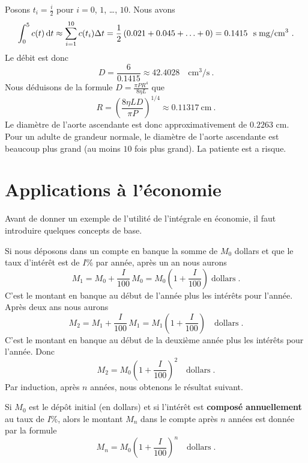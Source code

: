 {\begin{egg}
Posons $\displaystyle t_i = \frac{i}{2}$ pour $i=0$, $1$, \ldots,
$10$.  Nous avons
\[
\int_0^{5} c(t) \,\mathrm{d}t \approx \sum_{i=1}^{10} c(t_i) \Delta t
= \frac{1}{2} \left( 0.021 + 0.045 + \ldots + 0\right) = 0.1415
\ \text{ s\;mg/cm${^3}$} \ .
\]
Le débit est donc
\[
D = \frac{6}{0.1415} \approx 42.4028 \quad \text{cm$^3$/s} \ .
\]
Nous déduisons de la formule
$\displaystyle D = \frac{\pi P R^4}{8\eta L}$ que
\[
R = \left(\frac{8\eta L D}{\pi P}\right)^{1/4} \approx 0.11317 \
\text{cm} \ .
\]
Le diamètre de l'aorte ascendante est donc approximativement de $0.2263$ cm.
Pour un adulte de grandeur normale, le diamètre de l'aorte ascendante est
beaucoup plus grand (au moins $10$ fois plus grand).  La patiente est
a risque.
\end{egg}

\section{Applications à l'économie \eco}

Avant de donner un exemple de l'utilité de l'intégrale en économie, il faut
introduire quelques concepts de base.

Si nous déposons dans un compte en banque la somme de $M_0$ dollars et que le
taux d'intérêt est de $I$\% par année, après un an nous aurons
\[
M_1 = M_0 + \frac{I}{100}\,M_0 = M_0\left(1+\frac{I}{100}\right) \;
\text{dollars}\; .
\]
C'est le montant en banque au début de l'année plus les intérêts pour
l'année.  Après deux ans nous aurons
\[
M_2 = M_1 + \frac{I}{100}\,M_1 = M_1\left(1+\frac{I}{100}\right) \quad
\text{dollars}\; .
\]
C'est le montant en banque au début de la deuxième année plus les intérêts
pour l'année.  Donc
\[
M_2 = M_0\left(1+\frac{I}{100}\right)^2 \quad \text{dollars} \; .
\]
Par induction, après $n$ années, nous obtenons le résultat suivant.

\begin{meth} 
Si $M_0$ est le dépôt initial (en dollars) et si l'intérêt est
{\bfseries composé annuellement}
au taux de $I$\%, alors le montant $M_n$ dans le compte après $n$
années est donnée par la formule
\[
M_n = M_0\left(1+\frac{I}{100}\right)^n \quad \text{dollars} \; .
\]
\end{meth}

}
